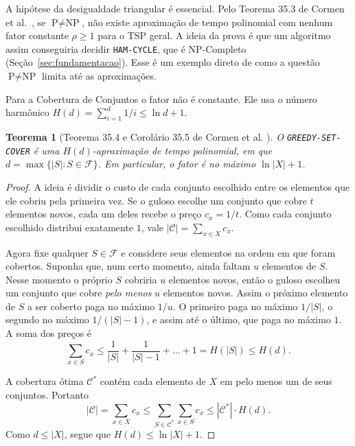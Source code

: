 \documentclass[conference]{IEEEtran}
\theoremstyle{definition}
\theoremstyle{plain}
\newtheorem{teorema}{Teorema}
\begin{document}
A hipótese da desigualdade triangular é essencial. Pelo Teorema 35.3 de Cormen et al.~\cite{cormen2012algoritmos}, se $\text{P} \neq \text{NP}$, não existe aproximação de tempo polinomial com nenhum fator constante $\rho \ge 1$ para o TSP geral. A ideia da prova é que um algoritmo assim conseguiria decidir \texttt{HAM-CYCLE}, que é NP-Completo (Seção~\ref{sec:fundamentacao}). Esse é um exemplo direto de como a questão $\text{P} \neq \text{NP}$ limita até as aproximações.

Para a Cobertura de Conjuntos o fator não é constante. Ele usa o número harmônico $H(d) = \sum_{i=1}^{d} 1/i \le \ln d + 1$.

\begin{teorema}[Teorema 35.4 e Corolário 35.5 de Cormen et al. \cite{cormen2012algoritmos}]
\label{teo:greedy_sc}
O \texttt{GREEDY-SET-COVER} é uma $H(d)$-aproximação de tempo polinomial, em que $d = \max\{|S| : S \in \mathcal{F}\}$. Em particular, o fator é no máximo $\ln|X| + 1$.
\end{teorema}

\begin{proof}
A ideia é dividir o custo de cada conjunto escolhido entre os elementos que ele cobriu pela primeira vez. Se o guloso escolhe um conjunto que cobre $t$ elementos novos, cada um deles recebe o preço $c_x = 1/t$. Como cada conjunto escolhido distribui exatamente $1$, vale $|\mathcal{C}| = \sum_{x \in X} c_x$.

Agora fixe qualquer $S \in \mathcal{F}$ e considere seus elementos na ordem em que foram cobertos. Suponha que, num certo momento, ainda faltam $u$ elementos de $S$. Nesse momento o próprio $S$ cobriria $u$ elementos novos, então o guloso escolheu um conjunto que cobre \textit{pelo menos} $u$ elementos novos. Assim o próximo elemento de $S$ a ser coberto paga no máximo $1/u$. O primeiro paga no máximo $1/|S|$, o segundo no máximo $1/(|S|-1)$, e assim até o último, que paga no máximo $1$. A soma dos preços é
\begin{equation}
\sum_{x \in S} c_x \le \frac{1}{|S|} + \frac{1}{|S|-1} + \dots + 1 = H(|S|) \le H(d).
\end{equation}

A cobertura ótima $\mathcal{C}^*$ contém cada elemento de $X$ em pelo menos um de seus conjuntos. Portanto
\begin{equation}
|\mathcal{C}| = \sum_{x \in X} c_x \le \sum_{S \in \mathcal{C}^*} \sum_{x \in S} c_x \le |\mathcal{C}^*| \cdot H(d).
\end{equation}
Como $d \le |X|$, segue que $H(d) \le \ln|X| + 1$.
\end{proof}
\end{document}
